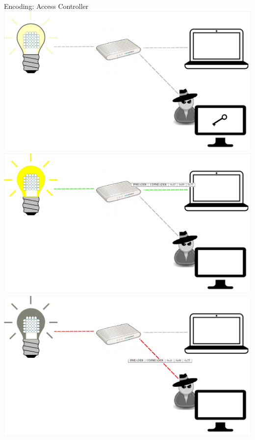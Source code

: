 \documentclass[11pt,t,usepdftitle=false,aspectratio=169]{beamer}
\begin{document}
\begin{frame}{Encoding: Access Controller}
{    }
     {
        \centering
        \includegraphics{img/AttackController_4.png}
    }
     {
        \centering
        \includegraphics{img/AttackController_5.png}
    }
     {
        \centering
        \includegraphics{img/AttackController_6.png}
    }
\end{frame}
\end{document}
